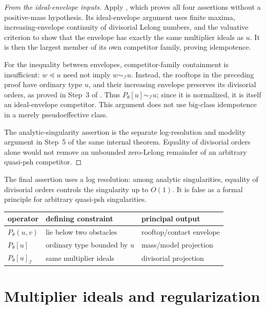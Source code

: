 \begin{proof}[From the ideal-envelope inputs]
Apply , which proves all four assertions
without a positive-mass hypothesis.  Its ideal-envelope argument uses
finite maxima, increasing-envelope continuity of divisorial Lelong
numbers, and the valuative criterion to show that the envelope has
exactly the same multiplier ideals as \(u\).  It is then the largest
member of its own competitor family, proving idempotence.

For the inequality between envelopes, competitor-family containment is
insufficient: \(w\preceq u\) need not imply \(w\sim_{\mathcal I}u\).
Instead, the rooftops in the preceding proof have ordinary type \(u\),
and their increasing envelope preserves its divisorial orders, as proved
in Step~3 of .  Thus
\(P_\theta[u]\sim_{\mathcal I}u\); since it is normalized, it is itself
an ideal-envelope competitor.  This argument does not use big-class
idempotence in a merely pseudoeffective class.

The analytic-singularity assertion is the separate log-resolution and
modelity argument in Step~5 of the same internal theorem.  Equality of
divisorial orders alone would not remove an unbounded zero-Lelong
remainder of an arbitrary quasi-psh competitor.
\end{proof}

The final assertion uses a log resolution: among analytic singularities,
equality of divisorial orders controls the singularity up to \(O(1)\).
It is false as a formal principle for arbitrary quasi-psh singularities.

\begin{center}
\begin{tabular}{lll}
\toprule
operator & defining constraint & principal output\\
\midrule
\(P_\theta(u,v)\) & lie below two obstacles & rooftop/contact envelope\\
\(P_\theta[u]\) & ordinary type bounded by \(u\) & mass/model projection\\
\(P_\theta[u]_{\mathcal I}\) & same multiplier ideals & divisorial projection\\
\bottomrule
\end{tabular}
\end{center}

\section{Multiplier ideals and regularization}
\label{sec:appH-multiplier-ideals}


